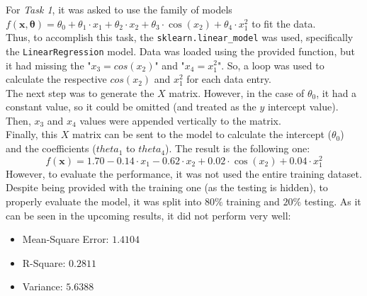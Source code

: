 \documentclass[11pt]{scrartcl}
\begin{document}
    For \textit{Task 1}, it was asked to use the family of models $f(\mathbf{x}, \boldsymbol{\theta}) = \theta_0 + \theta_1 \cdot x_1 + \theta_2 \cdot x_2 + \theta_3 \cdot \cos(x_2) + \theta_4 \cdot x_1^{2}$ to fit the data.\\
    Thus, to accomplish this task, the \texttt{sklearn.linear\_model} was used, specifically the \texttt{LinearRegression} model. Data was loaded using the provided function, but it had missing the "$x_3 = cos(x_2)$" and "$x_4 = x_1^2$". So, a loop was used to calculate the respective $cos(x_2)$ and $x_1^2$ for each data entry.\\
    The next step was to generate the $X$ matrix. However, in the case of $\theta_0$, it had a constant value, so it could be omitted (and treated as the $y$ intercept value). Then, $x_3$ and $x_4$ values were appended vertically to the matrix.\\
    Finally, this $X$ matrix can be sent to the model to calculate the intercept ($\theta_0$) and the coefficients ($theta_1$ to $theta_4$). The result is the following one:
    $$f(\mathbf{x}) = 1.70 - 0.14 \cdot x_1 - 0.62 \cdot x_2 + 0.02 \cdot \cos(x_2) + 0.04 \cdot x_1^{2}$$
    However, to evaluate the performance, it was not used the entire training dataset. Despite being provided with the training one (as the testing is hidden), to properly evaluate the model, it was split into $80\%$ training and $20\%$ testing. As it can be seen in the upcoming results, it did not perform very well:
    \begin{itemize}
        \item Mean-Square Error: $1.4104$
        \item R-Square: $0.2811$
        \item Variance: $5.6388$
    \end{itemize}
\end{document}
